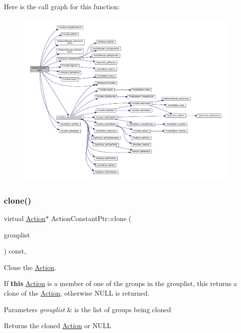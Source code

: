 Here is the call graph for this function\+:
\nopagebreak
\begin{figure}[H]
\begin{center}
\leavevmode
\includegraphics[width=350pt]{class_action_constant_ptr_a3667d599128a545967351ba54f4cce42_cgraph}
\end{center}
\end{figure}
\mbox{\label{class_action_constant_ptr_a03964225abf6a06d0b8eb832a94ce16a}} 
\subsubsection{\texorpdfstring{clone()}{clone()}}
{\footnotesize\ttfamily virtual \mbox{\hyperlink{class_action}{Action}}$\ast$ Action\+Constant\+Ptr\+::clone (\begin{DoxyParamCaption}\item[{const \mbox{\hyperlink{class_action_group_list}{Action\+Group\+List}} \&}]{grouplist }\end{DoxyParamCaption}) const\hspace{0.3cm}{\ttfamily [inline]}, {\ttfamily [virtual]}}



Clone the \mbox{\hyperlink{class_action}{Action}}. 

If {\bfseries{this}} \mbox{\hyperlink{class_action}{Action}} is a member of one of the groups in the grouplist, this returns a clone of the \mbox{\hyperlink{class_action}{Action}}, otherwise N\+U\+LL is returned. 
\begin{DoxyParams}{Parameters}
{\em grouplist} & is the list of groups being cloned \\
\hline
\end{DoxyParams}
\begin{DoxyReturn}{Returns}
the cloned \mbox{\hyperlink{class_action}{Action}} or N\+U\+LL 
\end{DoxyReturn}



